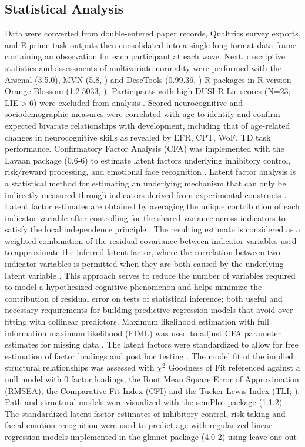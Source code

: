 \documentclass[utf8]{stylesheet}
\begin{document}
\subsection{Statistical Analysis} Data were converted from double-entered paper records, Qualtrics survey exports, and E-prime task outputs then consolidated into a single long-format data frame containing an observation for each participant at each wave. Next, descriptive statistics and assessments of multivariate normality were performed with the Arsenal (3.5.0), MVN (5.8, \cite{MVN}) and DescTools (0.99.36, \cite{DescTools}) R packages in R version Orange Blossom (1.2.5033, \cite{R}). Participants with high DUSI-R Lie scores (N=23; LIE$>6$) were excluded from analysis \citep{dalla2003effects}. Scored neurocognitive and sociodemographic measures were correlated with age to identify and confirm expected bivarate relationships with development, including that of age-related changes in neurocognitive skills as revealed by EFR, CPT, WoF, TD task performance. Confirmatory Factor Analysis (CFA) was implemented with the Lavaan package (0.6-6) to estimate latent factors underlying inhibitory control, risk/reward processing, and emotional face recognition \citep{Lavaan}. Latent factor analysis is a statistical method for estimating an underlying mechanism that can only be indirectly measured through indicators derived from experimental constructs \citep{finch2015latent}. Latent factor estimates are obtained by averaging the unique contribution of each indicator variable after controlling for the shared variance across indicators to satisfy the local independence principle \citep{sobel1997measurement}. The resulting estimate is considered as a weighted combination of the residual covariance between indicator variables used to approximate the inferred latent factor, where the correlation between two indicator variables is permitted when they are both caused by the underlying latent variable \citep{cooper2019neuroimaging}. This approach serves to reduce the number of variables required to model a hypothesized cognitive phenomenon and helps minimize the contribution of residual error on tests of statistical inference; both useful and necessary requirements for building predictive regression models that avoid over-fitting with collinear predictors. Maximum likelihood estimation with full information maximum likelihood (FIML) was used to adjust CFA parameter estimates for missing data \citep{cham2017full}. The latent factors were standardized to allow for free estimation of factor loadings and post hoc testing \citep{HuTzeBentler1998}. The model fit of the implied structural relationships was assessed with $\chi^2$ Goodness of Fit referenced against a null model with $0$ factor loadings, the Root Mean Square Error of Approximation (RMSEA), the Comparative Fit Index (CFI) and the Tucker-Lewis Index (TLI; \cite{KennyEtAl2015,HuTzeBentler1999, wu2009evaluating}). Path and structural models were visualized with the semPlot package (1.1.2) . The standardized latent factor estimates of inhibitory control, risk taking and facial emotion recognition were used to predict age with regularized linear regression models implemented in the glmnet package (4.0-2) using leave-one-out 
\end{document}
